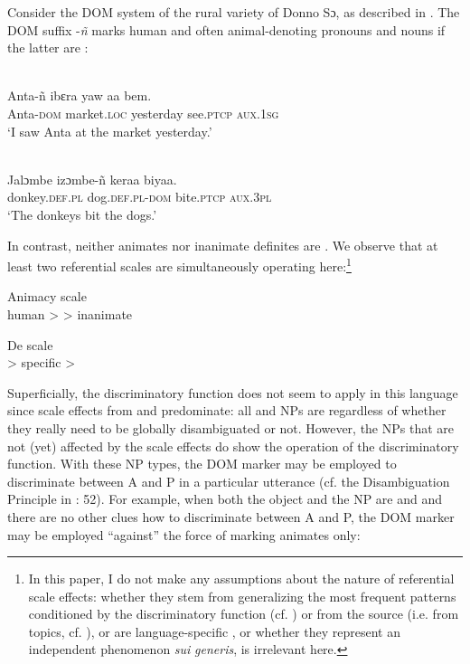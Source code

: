 \documentclass[output=paper]{langsci/langscibook}
\begin{document}
Consider the DOM system of the rural variety of Donno Sɔ, as described in \citet{Culy1995}. The DOM suffix \nobreakdash-\textit{ñ} marks human and often animal-denoting pronouns and nouns if the latter are :

\ea\label{ex:serzant:4}
\\
\gll   Anta-ñ     ibɛra     yaw     aa      bem.\\
     Anta-\textsc{dom}  market.\textsc{loc}  yesterday  see.\textsc{ptcp} \textsc{aux.1sg}\\
\glt ‘I saw Anta at the market yesterday.’
\z

\ea\label{ex:serzant:5}
\\
\gll  Jalɔmbe   izɔmbe-ñ     keraa     biyaa.\\
     donkey.\textsc{def.pl} dog.\textsc{def.pl-dom}   bite.\textsc{ptcp}   \textsc{aux.3pl}\\
\glt ‘The donkeys bit the dogs.’
\z

In contrast, neither  animates nor inanimate definites are . We observe that at least two referential scales are simultaneously operating here:\footnote{In this paper, I do not make any assumptions about the nature of referential scale effects: whether they stem from generalizing the most frequent patterns conditioned by the discriminatory function (cf. \citealt{Aissen2003}) or from the source (i.e. from topics, cf. \citealt{DalrympleNikolaeva2011}), or are language-specific \citep{BickelEtAl2015}, or whether they represent an independent phenomenon \textit{sui} \textit{generis}, is irrelevant here.}

\newpage

\ea\label{ex:serzant:6}
Animacy scale\\
human >  > inanimate
\z

\ea\label{ex:serzant:7}
De scale\\
 > specific > 
\z

Superficially, the discriminatory function does not seem to apply in this language since scale effects from  and  predominate: all  and  NPs are  regardless of whether they really need to be globally disambiguated or not. However, the   NPs that are not (yet) affected by the scale effects do show the operation of the discriminatory function. With these NP types, the DOM marker may be employed to discriminate between A and P in a particular utterance (cf. the Disambiguation Principle in \citealt{Culy1995}: 52). For example, when both the object and the  NP are  and  and there are no other clues how to discriminate between A and P, the DOM marker may be employed “against” the force of marking  animates only:
\end{document}
